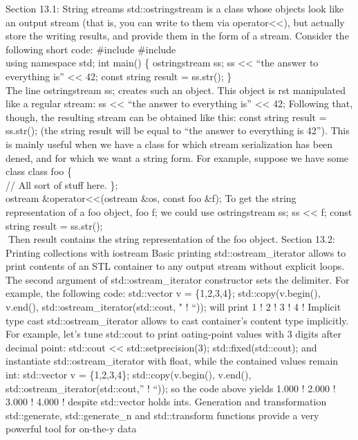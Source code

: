 Section 13.1: String streams std::ostringstream is a class whose objects
look like an output stream (that is, you can write to them via
operator\textless\textless), but actually store the writing results, and
provide them in the form of a stream. Consider the following short code:
\#include \#include \\
using namespace std; int main() \{ ostringstream ss; ss
\textless\textless{} ``the answer to everything is''
\textless\textless{} 42; const string result = ss.str(); \}\\
The line ostringstream ss; creates such an object. This object is rst
manipulated like a regular stream: ss \textless\textless{} ``the answer
to everything is'' \textless\textless{} 42; Following that, though, the
resulting stream can be obtained like this: const string result =
ss.str(); (the string result will be equal to ``the answer to everything
is 42''). This is mainly useful when we have a class for which stream
serialization has been dened, and for which we want a string form. For
example, suppose we have some class class foo \{\\
// All sort of stuff here. \};\\
ostream \&operator\textless\textless(ostream \&os, const foo \&f); To
get the string representation of a foo object, foo f; we could use
ostringstream ss; ss \textless\textless{} f; const string result =
ss.str();\\
Then result contains the string representation of the foo object.
Section 13.2: Printing collections with iostream Basic printing
std::ostream\_iterator allows to print contents of an STL container to
any output stream without explicit loops. The second argument of
std::ostream\_iterator constructor sets the delimiter. For example, the
following code: std::vector v = \{1,2,3,4\}; std::copy(v.begin(),
v.end(), std::ostream\_iterator(std::cout, " ! ``)); will print 1 ! 2 !
3 ! 4 ! Implicit type cast std::ostream\_iterator allows to cast
container's content type implicitly. For example, let's tune std::cout
to print oating-point values with 3 digits after decimal point:
std::cout \textless\textless{} std::setprecision(3);
std::fixed(std::cout); and instantiate std::ostream\_iterator with
float, while the contained values remain int: std::vector v =
\{1,2,3,4\}; std::copy(v.begin(), v.end(),
std::ostream\_iterator(std::cout,'' ! ``)); so the code above yields
1.000 ! 2.000 ! 3.000 ! 4.000 ! despite std::vector holds ints.
Generation and transformation std::generate, std::generate\_n and
std::transform functions provide a very powerful tool for on-the-y data
